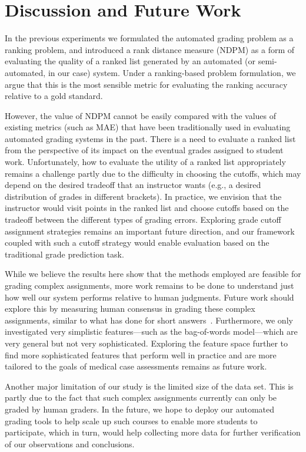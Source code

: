 \section{Discussion and Future Work}

In the previous experiments we formulated the automated grading problem as
a ranking problem, and introduced a rank distance measure (NDPM) as a form
of evaluating the quality of a ranked list generated by an automated (or
semi-automated, in our case) system. Under a ranking-based problem
formulation, we argue that this is the most sensible metric for evaluating
the ranking accuracy relative to a gold standard.

However, the value of NDPM cannot be easily compared with the values of
existing metrics (such as MAE) that have been traditionally used in
evaluating automated grading systems in the past. There is a need to
evaluate a ranked list from the perspective of its impact on the eventual
grades assigned to student work. Unfortunately, how to evaluate the utility
of a ranked list appropriately remains a challenge partly due to the
difficulty in choosing the cutoffs, which may depend on the desired
tradeoff that an instructor wants (e.g., a desired distribution of grades
in different brackets). In practice, we envision that the instructor would
visit points in the ranked list and choose cutoffs based on the tradeoff
between the different types of grading errors. Exploring grade cutoff
assignment strategies remains an important future direction, and our
framework coupled with such a cutoff strategy would enable evaluation based
on the traditional grade prediction task.

While we believe the results here show that the methods employed are
feasible for grading complex assignments, more work remains to be done to
understand just how well our system performs relative to human judgments.
Future work should explore this by measuring human consensus in grading
these complex assignments, similar to what has done for short
answers~\cite{Mohler:2009:EACL}. Furthermore, we only investigated very
simplistic features---such as the bag-of-words model---which are very
general but not very sophisticated. Exploring the feature space further to
find more sophisticated features that perform well in practice and are more
tailored to the goals of medical case assessments remains as future work.

Another major limitation of our study is the limited size of the data set.
This is partly due to the fact that such complex assignments currently can
only be graded by human graders. In the future, we hope to deploy our
automated grading tools to help scale up such courses to enable more
students to participate, which in turn, would help collecting more data
for further verification of our observations and
conclusions.

